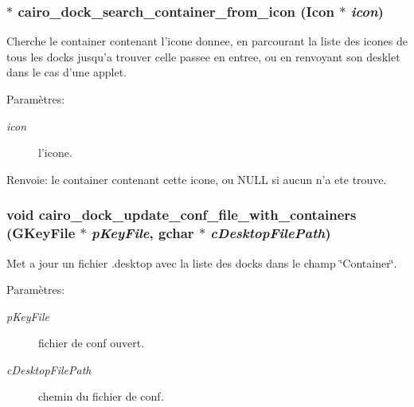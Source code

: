 \subsubsection{$\ast$ cairo\_\-dock\_\-search\_\-container\_\-from\_\-icon ({\bf Icon} $\ast$ {\em icon})}\label{cairo-dock-dock-manager_8h_511c8944b1d87a6b40d4d675e2826ce9}


Cherche le container contenant l'icone donnee, en parcourant la liste des icones de tous les docks jusqu'a trouver celle passee en entree, ou en renvoyant son desklet dans le cas d'une applet. \begin{Desc}
\item[Paramètres:]
\begin{description}
\item[{\em icon}]l'icone. \end{description}
\end{Desc}
\begin{Desc}
\item[Renvoie:]le container contenant cette icone, ou NULL si aucun n'a ete trouve. \end{Desc}
\subsubsection{\setlength{\rightskip}{0pt plus 5cm}void cairo\_\-dock\_\-update\_\-conf\_\-file\_\-with\_\-containers (GKeyFile $\ast$ {\em pKeyFile}, gchar $\ast$ {\em cDesktopFilePath})}\label{cairo-dock-dock-manager_8h_235901a0980eedfdcc03f2ec54963310}


Met a jour un fichier .desktop avec la liste des docks dans le champ \char`\"{}Container\char`\"{}. \begin{Desc}
\item[Paramètres:]
\begin{description}
\item[{\em pKeyFile}]fichier de conf ouvert. \item[{\em cDesktopFilePath}]chemin du fichier de conf. \end{description}
\end{Desc}
